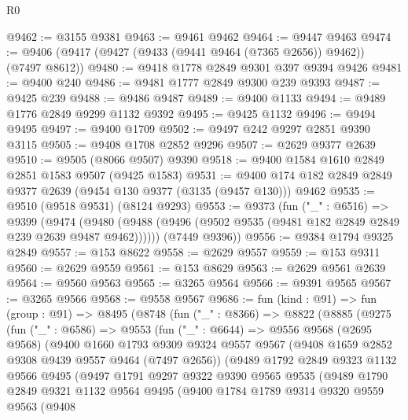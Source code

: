 \begin{lexlean}{R0}
\begin{coremodule}
@9462 := @3155 @9381
@9463 := @9461 @9462
@9464 := @9447 @9463
@9474 := @9406 (@9417 (@9427 (@9433 (@9441 @9464 (@7365 @2656)) @9462)) (@7497 @8612))
@9480 := @9418 @1778 @2849 @9301 @397 @9394 @9426
@9481 := @9400 @240
@9486 := @9481 @1777 @2849 @9300 @239 @9393
@9487 := @9425 @239
@9488 := @9486 @9487
@9489 := @9400 @1133
@9494 := @9489 @1776 @2849 @9299 @1132 @9392
@9495 := @9425 @1132
@9496 := @9494 @9495
@9497 := @9400 @1709
@9502 := @9497 @242 @9297 @2851 @9390 @3115
@9505 := @9408 @1708 @2852 @9296
@9507 := @2629 @9377 @2639
@9510 := @9505 (@8066 @9507) @9390
@9518 := @9400 @1584 @1610 @2849 @2851 @1583 @9507 (@9425 @1583)
@9531 := @9400 @174 @182 @2849 @2849 @9377 @2639 (@9454 @130 @9377 (@3135 (@9457 @130))) @9462
@9535 := @9510 (@9518 @9531) (@8124 @9293)
@9553 := @9373
    (fun ("_" : @6516) =>
    @9399
      (@9474 (@9480 (@9488 (@9496 (@9502 @9535 (@9481 @182 @2849 @2849 @239 @2639 @9487 @9462))))))
      (@7449 @9396))
@9556 := @9384 @1794 @9325 @2849
@9557 := @153 @8622
@9558 := @2629 @9557
@9559 := @153 @9311
@9560 := @2629 @9559
@9561 := @153 @8629
@9563 := @2629 @9561 @2639
@9564 := @9560 @9563
@9565 := @3265 @9564
@9566 := @9391 @9565
@9567 := @3265 @9566
@9568 := @9558 @9567
@9686 := fun (kind : @91) =>
  fun (group : @91) =>
  @8495
    (@8748
      (fun ("_" : @8366) =>
      @8822
        (@8885
          (@9275
            (fun ("_" : @6586) =>
            @9553
              (fun ("_" : @6644) =>
              @9556
                @9568
                (@2695 @9568)
                (@9400
                  @1660
                  @1793
                  @9309
                  @9324
                  @9557
                  @9567
                  (@9408 @1659 @2852 @9308 @9439 @9557 @9464 (@7497 @2656))
                  (@9489
                    @1792
                    @2849
                    @9323
                    @1132
                    @9566
                    @9495
                    (@9497
                      @1791
                      @9297
                      @9322
                      @9390
                      @9565
                      @9535
                      (@9489
                        @1790
                        @2849
                        @9321
                        @1132
                        @9564
                        @9495
                        (@9400
                          @1784
                          @1789
                          @9314
                          @9320
                          @9559
                          @9563
                          (@9408

\end{coremodule}
\end{lexlean}
